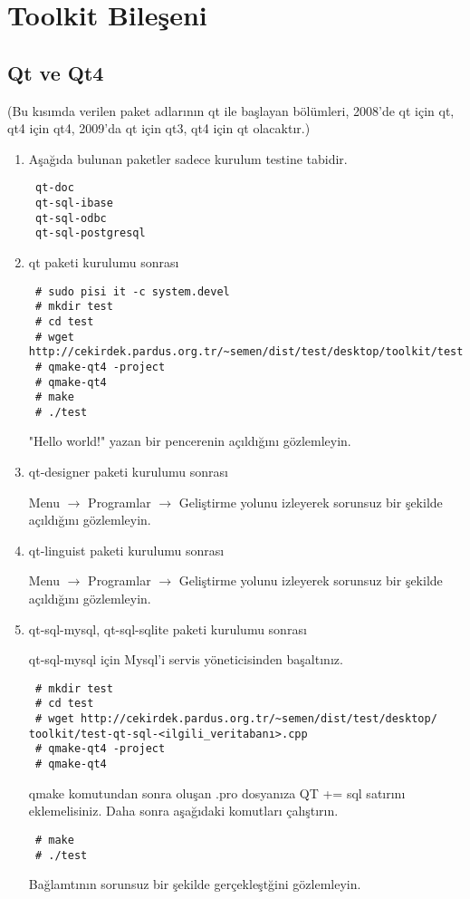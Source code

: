 \documentclass[a4paper,10pt]{article}
\begin{document}
\section{Toolkit Bileşeni}
\subsection*{Qt ve Qt4}

(Bu kısımda verilen paket adlarının qt ile başlayan bölümleri, 2008'de qt için qt, qt4 için qt4, 2009'da qt için qt3, qt4 için qt olacaktır.)
\begin{enumerate}
 \item Aşağıda bulunan paketler sadece kurulum testine tabidir.
\begin{verbatim}
 qt-doc
 qt-sql-ibase
 qt-sql-odbc
 qt-sql-postgresql
\end{verbatim}
 \item qt paketi kurulumu sonrası

\begin{verbatim}
 # sudo pisi it -c system.devel
 # mkdir test
 # cd test
 # wget http://cekirdek.pardus.org.tr/~semen/dist/test/desktop/toolkit/test.cpp
 # qmake-qt4 -project
 # qmake-qt4
 # make
 # ./test
\end{verbatim}

"Hello world!" yazan bir pencerenin açıldığını gözlemleyin.
\item qt-designer paketi kurulumu sonrası

Menu $\rightarrow$ Programlar $\rightarrow$ Geliştirme yolunu izleyerek sorunsuz bir şekilde açıldığını gözlemleyin.

\item qt-linguist paketi kurulumu sonrası

Menu $\rightarrow$ Programlar $\rightarrow$ Geliştirme yolunu izleyerek sorunsuz bir şekilde açıldığını gözlemleyin.

\item qt-sql-mysql, qt-sql-sqlite paketi kurulumu sonrası

qt-sql-mysql için Mysql'i servis yöneticisinden başaltınız.
\begin{verbatim}
 # mkdir test
 # cd test
 # wget http://cekirdek.pardus.org.tr/~semen/dist/test/desktop/ 
toolkit/test-qt-sql-<ilgili_veritabanı>.cpp
 # qmake-qt4 -project
 # qmake-qt4	
\end{verbatim}
qmake komutundan sonra oluşan .pro dosyanıza QT += sql satırını eklemelisiniz. Daha sonra aşağıdaki komutları çalıştırın.
\begin{verbatim}
 # make
 # ./test
\end{verbatim}

Bağlamtının sorunsuz bir şekilde gerçekleştğini gözlemleyin.

\end{enumerate}
\end{document}
